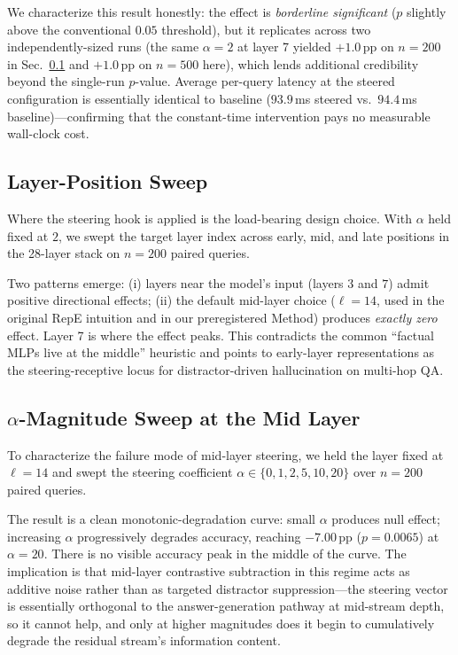\documentclass[conference]{IEEEtran}
\begin{document}
We characterize this result honestly: the effect is \emph{borderline significant} ($p$ slightly above the conventional $0.05$ threshold), but it replicates across two independently-sized runs (the same $\alpha\!=\!2$ at layer 7 yielded $+1.0$\,pp on $n\!=\!200$ in Sec.~\ref{sec:results-layer-sweep} and $+1.0$\,pp on $n\!=\!500$ here), which lends additional credibility beyond the single-run $p$-value. Average per-query latency at the steered configuration is essentially identical to baseline ($93.9$\,ms steered vs.\ $94.4$\,ms baseline)---confirming that the constant-time intervention pays no measurable wall-clock cost.

\subsection{Layer-Position Sweep}\label{sec:results-layer-sweep}

Where the steering hook is applied is the load-bearing design choice. With $\alpha$ held fixed at $2$, we swept the target layer index across early, mid, and late positions in the 28-layer stack on $n\!=\!200$ paired queries.



Two patterns emerge: (i) layers near the model's input (layers $3$ and $7$) admit positive directional effects; (ii) the default mid-layer choice ($\ell\!=\!14$, used in the original RepE intuition and in our preregistered Method) produces \emph{exactly zero} effect. Layer 7 is where the effect peaks. This contradicts the common ``factual MLPs live at the middle'' heuristic and points to early-layer representations as the steering-receptive locus for distractor-driven hallucination on multi-hop QA.

\subsection{$\alpha$-Magnitude Sweep at the Mid Layer}\label{sec:results-alpha-sweep}

To characterize the failure mode of mid-layer steering, we held the layer fixed at $\ell\!=\!14$ and swept the steering coefficient $\alpha \in \{0, 1, 2, 5, 10, 20\}$ over $n\!=\!200$ paired queries.



The result is a clean monotonic-degradation curve: small $\alpha$ produces null effect; increasing $\alpha$ progressively degrades accuracy, reaching $-7.00$\,pp ($p\!=\!0.0065$) at $\alpha\!=\!20$. There is no visible accuracy peak in the middle of the curve. The implication is that mid-layer contrastive subtraction in this regime acts as additive noise rather than as targeted distractor suppression---the steering vector is essentially orthogonal to the answer-generation pathway at mid-stream depth, so it cannot help, and only at higher magnitudes does it begin to cumulatively degrade the residual stream's information content.
\end{document}
